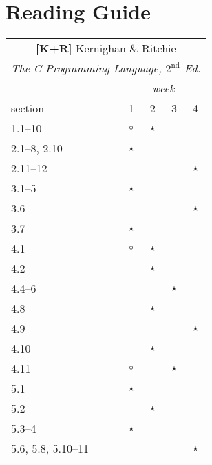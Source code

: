 \documentclass[a4paper]{article}
\newcommand{\refkr}{\textbf{[K+R]}\xspace}
\begin{document}
\section{Reading Guide}

\begin{table}
  \footnotesize
  \begin{minipage}[t]{0.5\columnwidth}
  \begin{tabular}{|l|c|c|c|c|}
    \hline
    \multicolumn{5}{|c|}{\refkr Kernighan \& Ritchie} \\
    \multicolumn{5}{|c|}{\emph{The C Programming Language, $2^\text{nd}$ Ed.}} \\
    \hline
                       & \multicolumn{4}{|c|}{\emph{week}} \\
    section            & 1       & 2       & 3       & 4  \\
    \hline
    1.1--10            & $\circ$ & $\star$ &         & \\
    \hline
    2.1--8, 2.10       & $\star$ &         &         & \\
    2.11--12           &         &         &         & $\star$ \\
    \hline
    3.1--5             & $\star$ &         &         & \\
    3.6                &         &         &         & $\star$ \\
    3.7                & $\star$ &         &         & \\
    \hline
    4.1                & $\circ$ & $\star$ &         & \\
    4.2                &         & $\star$ &         & \\
    4.4--6             &         &         & $\star$ & \\
    4.8                &         & $\star$ &         & \\
    4.9                &         &         &         & $\star$ \\
    4.10               &         & $\star$ &         & \\
    4.11               & $\circ$ &         & $\star$ & \\
    \hline
    5.1                & $\star$ &         &         & \\
    5.2                &         & $\star$ &         & \\
    5.3--4             & $\star$ &         &         & \\
    5.6, 5.8, 5.10--11 &         &         &         & $\star$ \\

\end{tabular}
\end{minipage}
\end{table}
\end{document}
